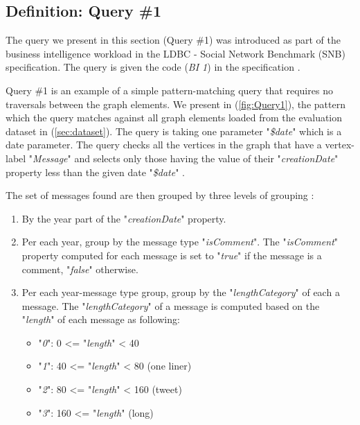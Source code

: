 {\subsection{Definition: Query \#1}
\label{subsec:qry1}

The query we present in this section (Query \#1) was introduced as part of the business intelligence workload in the LDBC - Social Network Benchmark (SNB) specification. The query is given the code (\textit{BI 1}) in the specification \cite{prat2017ldbc}. 

Query \#1 is an example of a simple pattern-matching query that requires no traversals between the graph elements. We present in (\ref{fig:Query1}), the pattern which the query matches against all graph elements loaded from the evaluation dataset in (\ref{sec:dataset}). The query is taking one parameter "\textit{\$date}" which is a date parameter. The query checks all the vertices in the graph that have a vertex-label "\textit{Message}" and selects only those having the value of their "\textit{creationDate}" property less than the given date "\textit{\$date}" \cite{prat2017ldbc}.

The set of messages found are then grouped by three levels of grouping \cite{prat2017ldbc}:

\begin{enumerate}

\item By the year part of the "\textit{creationDate}" property.
\item Per each year, group by the message type "\textit{isComment}". The "\textit{isComment}" property computed for each message is set to "\textit{true}" if the message is a comment, "\textit{false}" otherwise.
\item Per each year-message type group, group by the "\textit{lengthCategory}" of each a message. The "\textit{lengthCategory}" of a message is computed based on the "\textit{length}" of each message as following:
\begin{itemize}
    \item "\textit{0}": 0 <= "\textit{length}" < 40 
    \item "\textit{1}": 40 <= "\textit{length}" < 80 (one liner)
    \item "\textit{2}": 80 <= "\textit{length}" < 160 (tweet)
    \item "\textit{3}": 160 <= "\textit{length}" (long)\\
\end{itemize}


\end{enumerate}}
